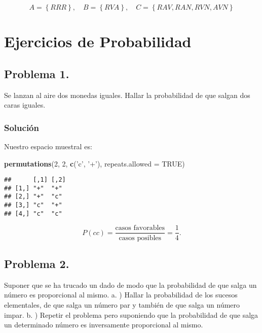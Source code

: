 \documentclass[
]{article}
\newenvironment{Shaded}{\begin{snugshade}}{\end{snugshade}}
\newcommand{\DataTypeTok}[1]{\textcolor[rgb]{0.13,0.29,0.53}{#1}}
\newcommand{\DecValTok}[1]{\textcolor[rgb]{0.00,0.00,0.81}{#1}}
\newcommand{\KeywordTok}[1]{\textcolor[rgb]{0.13,0.29,0.53}{\textbf{#1}}}
\newcommand{\NormalTok}[1]{#1}
\newcommand{\OtherTok}[1]{\textcolor[rgb]{0.56,0.35,0.01}{#1}}
\newcommand{\StringTok}[1]{\textcolor[rgb]{0.31,0.60,0.02}{#1}}
\begin{document}
\[
A = \left\{RRR\right\}, \quad B = \left\{RVA\right\}, \quad C = \left\{RAV, RAN, RVN, AVN \right\}
\]

\hypertarget{ejercicios-de-probabilidad}{%
\section{Ejercicios de Probabilidad}\label{ejercicios-de-probabilidad}}

\hypertarget{problema-1.}{%
\subsection{Problema 1.}\label{problema-1.}}

Se lanzan al aire dos monedas iguales. Hallar la probabilidad de que
salgan dos caras iguales.

\hypertarget{soluciuxf3n}{%
\subsubsection{Solución}\label{soluciuxf3n}}

Nuestro espacio muestral es:

\begin{Shaded}
\begin{Highlighting}[]
\KeywordTok{permutations}\NormalTok{(}\DecValTok{2}\NormalTok{, }\DecValTok{2}\NormalTok{, }\KeywordTok{c}\NormalTok{(}\StringTok{'c'}\NormalTok{, }\StringTok{'+'}\NormalTok{), }\DataTypeTok{repeats.allowed =} \OtherTok{TRUE}\NormalTok{)}
\end{Highlighting}
\end{Shaded}

\begin{verbatim}
##      [,1] [,2]
## [1,] "+"  "+" 
## [2,] "+"  "c" 
## [3,] "c"  "+" 
## [4,] "c"  "c"
\end{verbatim}

\[
P({cc}) = \frac{\textrm{casos favorables}}{\textrm{casos posibles}}= \frac{\textrm{1}}{4}.
\]

\hypertarget{problema-2.}{%
\subsection{Problema 2.}\label{problema-2.}}

Suponer que se ha trucado un dado de modo que la probabilidad de que
salga un número es proporcional al mismo. a. ) Hallar la probabilidad de
los sucesos elementales, de que salga un número par y también de que
salga un número impar. b. ) Repetir el problema pero suponiendo que la
probabilidad de que salga un determinado número es inversamente
proporcional al mismo.
\end{document}
